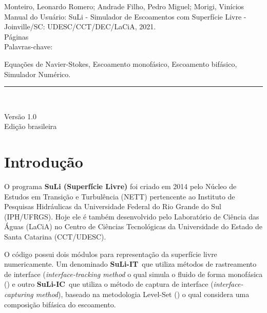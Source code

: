\documentclass[12pt, a4paper]{article}
\makeatletter
\newcommand{\SLIT}{{\bf SuLi-IT}}
\newcommand{\SLIC}{{\bf SuLi-IC}}
\let\thedate\@date
\makeatother
\begin{document}
\begin{titlepage}
\begin{flushleft}
Monteiro, Leonardo Romero; Andrade Filho, Pedro Miguel; Morigi, Vinícios \\[1 cm]
	
Manual do Usuário: SuLi - Simulador de Escoamentos com Superfície Livre - Joinville/SC: UDESC/CCT/DEC/LaCiA, 2021. \\[0.2 cm]
	
\pageref{LastPage} Páginas \\[1 cm]
	
Palavras-chave:

Equações de Navier-Stokes, Escoamento monofásico, Escoamento bifásico, Simulador Numérico. 
	
	
\rule{\linewidth}{0.2 mm} \\[1 cm]
	



\vspace{5cm}


	{\Large Versão 1.0 \\ Edição brasileira \\ \thedate}
	\end{flushleft}
	
\end{titlepage}




\newpage
\tableofcontents 
\newpage

\section{Introdução}
O programa {\bf SuLi (Superfície Livre)} foi criado em 2014 pelo Núcleo de Estudos em Transição e Turbulência (NETT) pertencente ao Instituto de Pesquisas Hidráulicas da Universidade Federal do Rio Grande do Sul (IPH/UFRGS). Hoje ele é também desenvolvido pelo Laboratório de Ciência das Águas (LaCiA) no Centro de Ciências Tecnológicas da Universidade do Estado de Santa Catarina (CCT/UDESC).

O código possui dois módulos para representação da superfície livre numericamente. Um denominado \SLIT\ que utiliza métodos de rastreamento de interface (\textit{interface-tracking method} o qual simula o fluido de forma monofásica (\cite{monteiro2014}) e outro \SLIC\ que utiliza o método de captura de interface (\textit{interface-capturing method}), baseado na metodologia Level-Set (\cite{monteiro2019}) o qual considera uma composição bifásica do escoamento. \label{itxic}
\end{document}
